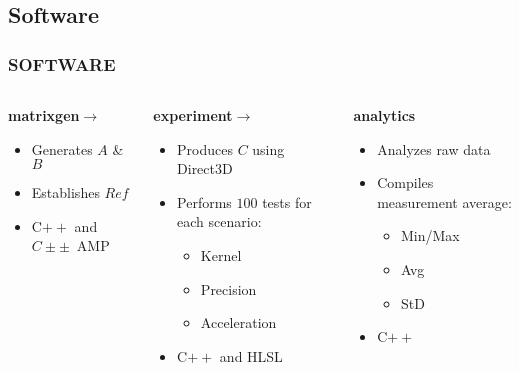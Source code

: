 \subsection{Software}
\begin{frame}
\frametitle{SOFTWARE}

\begin{columns}[T]
  \begin{column}{0.33\textwidth}
    \textbf{matrixgen}\hfill$\rightarrow$\hfill
    \begin{itemize}
    \item Generates $A$ \& $B$
    \item Establishes $Ref$
    \item C$++$ and $C±±$~AMP
    \end{itemize}
  \end{column}
  \begin{column}{0.33\textwidth}
    \textbf{experiment}\hfill$\rightarrow$\hfill
    \begin{itemize}
    \item Produces $C$ using Direct3D
    \item Performs $100$ tests for each scenario:
      \begin{itemize}
      \item Kernel
      \item Precision\footnotemark
      \item Acceleration
      \end{itemize}
    \item C$++$ and HLSL
    \end{itemize}
  \end{column}
  \begin{column}{0.33\textwidth}
    \textbf{analytics}
    \begin{itemize}
    \item Analyzes raw data
    \item Compiles measurement average:
      \begin{itemize}
      \item Min/Max
      \item Avg
      \item StD
      \end{itemize}
    \item C$++$
    \end{itemize}
  \end{column}
\end{columns}


\end{frame}

